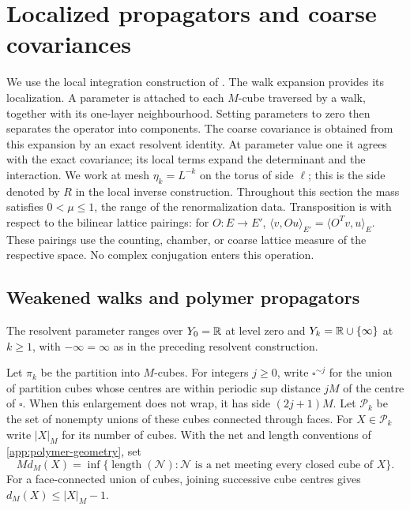 \section{Localized propagators and coarse covariances}\label{sec:fermion-primitives}

We use the local integration construction of \cite[Section~11]{QED3Manuscript}. The walk expansion provides its localization. A parameter is attached to each $M$-cube traversed
by a walk, together with its one-layer neighbourhood. Setting parameters
to zero then separates the operator into components. The coarse
covariance is obtained from this expansion by an exact resolvent
identity. At parameter value one it agrees with the exact covariance;
its local terms expand the determinant and the interaction.
We work at mesh $\eta_k=L^{-k}$ on the torus of side $\ell$; this is
the side denoted by $R$ in the local inverse construction.
Throughout this section the mass satisfies $0<\mu\le1$,
the range of the renormalization data.
Transposition is with respect to the bilinear lattice pairings:
for $O:E\to E'$, $\langle v,Ou\rangle_{E'}=
\langle O^Tv,u\rangle_E$. These pairings use the counting,
chamber, or coarse lattice measure of the respective space.
No complex conjugation enters this operation.

\subsection{Weakened walks and polymer propagators}\label{subsec:weakened-walks}

The resolvent parameter ranges over $Y_0=\mathbb R$ at level zero and
$Y_k=\mathbb R\cup\{\infty\}$ at $k\ge1$, with $-\infty=\infty$
as in the preceding resolvent construction.

Let $\pi_k$ be the partition into $M$-cubes. For integers $j\ge0$, write
$\square^{\sim j}$ for the union of partition cubes whose centres
are within periodic sup distance $jM$ of the centre of $\square$.
When this enlargement does not wrap, it has side $(2j+1)M$.
Let $\mathcal P_k$ be the set of
nonempty unions of these cubes connected through faces. For $X\in\mathcal P_k$
write $|X|_M$ for its number of cubes. With the net and length
conventions of \cref{app:polymer-geometry}, set
\[
 M d_M(X)=\inf\{\operatorname{length}(\mathcal N):
       \mathcal N\text{ is a net meeting every closed cube of }X\}.
\]
For a face-connected union of cubes, joining successive cube centres gives
$d_M(X)\le |X|_M-1$.

